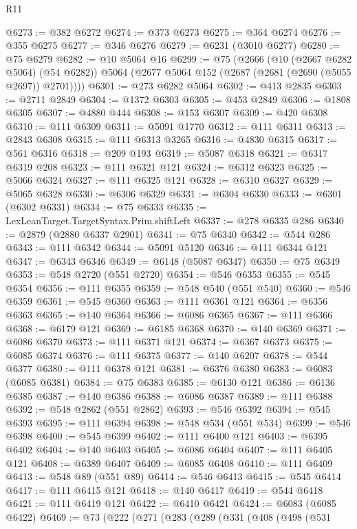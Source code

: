 \begin{lexlean}{R11}
\begin{coremodule}
@6273 := @382 @6272
@6274 := @373 @6273
@6275 := @364 @6274
@6276 := @355 @6275
@6277 := @346 @6276
@6279 := @6231 (@3010 @6277)
@6280 := @75 @6279
@6282 := @10 @5064 @16
@6299 := @75
    (@2666
      (@10 (@2667 @6282 @5064) (@54 @6282))
      @5064
      (@2677 @5064 @152 (@2687 (@2681 (@2690 (@5055 @2697)) @2701))))
@6301 := @273 @6282 @5064
@6302 := @413 @2835
@6303 := @2711 @2849
@6304 := @1372 @6303
@6305 := @453 @2849
@6306 := @1808 @6305
@6307 := @4880 @444
@6308 := @153 @6307
@6309 := @420 @6308
@6310 := @111 @6309
@6311 := @5091 @1770
@6312 := @111 @6311
@6313 := @2843 @6308
@6315 := @111 @6313 @3265
@6316 := @4830 @6315
@6317 := @561 @6316
@6318 := @209 @193
@6319 := @5087 @6318
@6321 := @6317 @6319 @208
@6323 := @111 @6321 @121
@6324 := @6312 @6323
@6325 := @5066 @6324
@6327 := @111 @6325 @121
@6328 := @6310 @6327
@6329 := @5065 @6328
@6330 := @6306 @6329
@6331 := @6304 @6330
@6333 := @6301 (@6302 @6331)
@6334 := @75 @6333
@6335 := LexLeanTarget.TargetSyntax.Prim.shiftLeft
@6337 := @278 @6335 @286
@6340 := @2879 (@2880 @6337 @2901)
@6341 := @75 @6340
@6342 := @544 @286
@6343 := @111 @6342
@6344 := @5091 @5120
@6346 := @111 @6344 @121
@6347 := @6343 @6346
@6349 := @6148 (@5087 @6347)
@6350 := @75 @6349
@6353 := @548 @2720 (@551 @2720)
@6354 := @546 @6353
@6355 := @545 @6354
@6356 := @111 @6355
@6359 := @548 @540 (@551 @540)
@6360 := @546 @6359
@6361 := @545 @6360
@6363 := @111 @6361 @121
@6364 := @6356 @6363
@6365 := @140 @6364
@6366 := @6086 @6365
@6367 := @111 @6366
@6368 := @6179 @121
@6369 := @6185 @6368
@6370 := @140 @6369
@6371 := @6086 @6370
@6373 := @111 @6371 @121
@6374 := @6367 @6373
@6375 := @6085 @6374
@6376 := @111 @6375
@6377 := @140 @6207
@6378 := @544 @6377
@6380 := @111 @6378 @121
@6381 := @6376 @6380
@6383 := @6083 (@6085 @6381)
@6384 := @75 @6383
@6385 := @6130 @121
@6386 := @6136 @6385
@6387 := @140 @6386
@6388 := @6086 @6387
@6389 := @111 @6388
@6392 := @548 @2862 (@551 @2862)
@6393 := @546 @6392
@6394 := @545 @6393
@6395 := @111 @6394
@6398 := @548 @534 (@551 @534)
@6399 := @546 @6398
@6400 := @545 @6399
@6402 := @111 @6400 @121
@6403 := @6395 @6402
@6404 := @140 @6403
@6405 := @6086 @6404
@6407 := @111 @6405 @121
@6408 := @6389 @6407
@6409 := @6085 @6408
@6410 := @111 @6409
@6413 := @548 @89 (@551 @89)
@6414 := @546 @6413
@6415 := @545 @6414
@6417 := @111 @6415 @121
@6418 := @140 @6417
@6419 := @544 @6418
@6421 := @111 @6419 @121
@6422 := @6410 @6421
@6424 := @6083 (@6085 @6422)
@6469 := @73
    (@222
      (@271
        (@283
          (@289
            (@331
              (@408
                (@498
                  (@531

\end{coremodule}
\end{lexlean}
